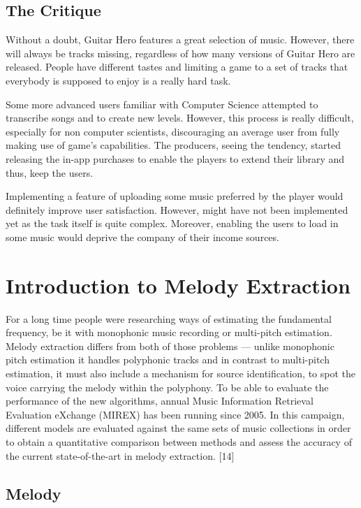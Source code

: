 \subsection{The Critique}

Without a doubt, Guitar Hero features a great selection of music. However, there will always be tracks missing, regardless of how many versions of Guitar Hero are released. People have different tastes and limiting a game to a set of tracks that everybody is supposed to enjoy is a really hard task. 

Some more advanced users familiar with Computer Science attempted to transcribe songs and to create new levels. However, this process is really difficult, especially for non computer scientists, discouraging an average user from fully making use of game’s capabilities. The producers, seeing the tendency, started releasing the in-app purchases to enable the players to extend their library and thus, keep the users. 

Implementing a feature of uploading some music preferred by the player would definitely improve user satisfaction. However, might have not been implemented yet as the task itself is quite complex. Moreover, enabling the users to load in some music would deprive the company of their income sources.


\section{Introduction to Melody Extraction}

For a long time people were researching ways of estimating the fundamental frequency, be it with monophonic music recording or multi-pitch estimation. Melody extraction differs from both of those problems — unlike monophonic pitch estimation it handles polyphonic tracks and in contrast to multi-pitch estimation, it must also include a mechanism for source identification, to spot the voice carrying the melody within the polyphony.
To be able to evaluate the performance of the new algorithms, annual Music Information Retrieval Evaluation eXchange (MIREX) has been running since 2005. In this campaign, different models are evaluated against the same sets of music collections in order to obtain a quantitative comparison between methods and assess the accuracy of the current state-of-the-art in melody extraction. [14]


\subsection{Melody}

